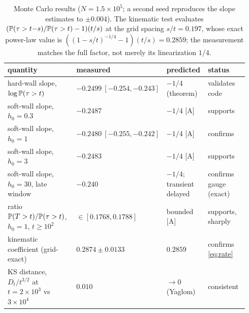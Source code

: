 \begin{table}[h]\centering\footnotesize
\setlength{\tabcolsep}{4pt}
\begin{tabular}{@{}p{0.34\linewidth}p{0.22\linewidth}p{0.18\linewidth}p{0.20\linewidth}@{}}
\toprule
quantity & measured & predicted & status\\
\midrule
hard-wall slope, $\log\mathbb{P}(\tau>t)$ & $-0.2499\ [-0.254,-0.243]$ &
$-1/4$ (theorem) & validates code\\
soft-wall slope, $h_0=0.3$ & $-0.2487$ & $-1/4$ [A] & supports\\
soft-wall slope, $h_0=1$ & $-0.2480\ [-0.255,-0.242]$ & $-1/4$ [A] &
confirms\\
soft-wall slope, $h_0=3$ & $-0.2483$ & $-1/4$ [A] & supports\\
soft-wall slope, $h_0=30$, late window & $-0.240$ & $-1/4$;
transient delayed & confirms gauge (exact)\\
ratio $\mathbb{P}(T>t)/\mathbb{P}(\tau>t)$, $h_0=1$, $t\ge10^2$ &
$\in[0.1768,0.1788]$ & bounded [A] & supports, sharply\\
kinematic coefficient (grid-exact) & $0.2874\pm0.0133$ & $0.2859$ &
confirms \eqref{eq:rate}\\
KS distance, $D_t/t^{3/2}$ at $t=2\times10^3$ vs $3\times10^4$ &
$0.010$ & $\to0$ (Yaglom) & consistent\\
\bottomrule
\end{tabular}
\caption{\small Monte Carlo results ($N=1.5\times10^5$; a second seed
reproduces the slope estimates to $\pm0.004$). The kinematic test
evaluates $(\mathbb{P}(\tau>t{-}s)/\mathbb{P}(\tau>t)-1)(t/s)$ at the grid spacing
$s/t=0.197$, whose exact power-law value is
$((1{-}s/t)^{-1/4}{-}1)(t/s)=0.2859$; the measurement matches the full
factor, not merely its linearization $1/4$.}
\label{tab:numerics}
\end{table}

